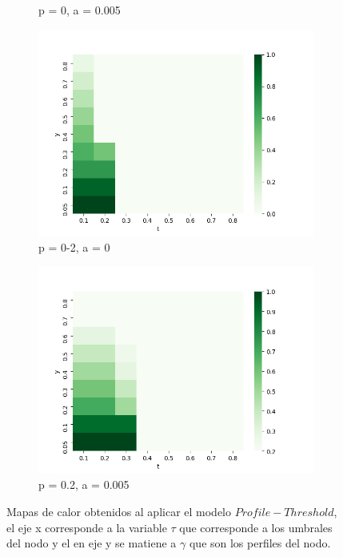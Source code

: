 \documentclass{article}
\begin{document}
\begin{figure}[h]
\begin{subfigure}[b]{0.5\textwidth}
		\caption{p = 0, a = 0.005}
		\label{fig:hm10}
	\end{subfigure}
	\hfill
	\begin{subfigure}[b]{0.5\textwidth}
		\includegraphics[width=\textwidth]{../Images/hm11.png}
		\caption{p = 0-2, a = 0}
		\label{fig:hm11}
	\end{subfigure}
	\begin{subfigure}[b]{0.5\textwidth}
		\includegraphics[width=\textwidth]{../Images/hm12.png}
		\caption{p = 0.2, a = 0.005}
		\label{fig:hm12}
	\end{subfigure}
	\label{fig:hm3}
	\caption{Mapas de calor obtenidos al aplicar el modelo $Profile-Threshold$, el eje x corresponde a la variable $\tau$ que corresponde a los umbrales del nodo y el en eje y se matiene a $\gamma$ que son los perfiles del nodo.}
\end{figure}
\newpage
\end{document}

